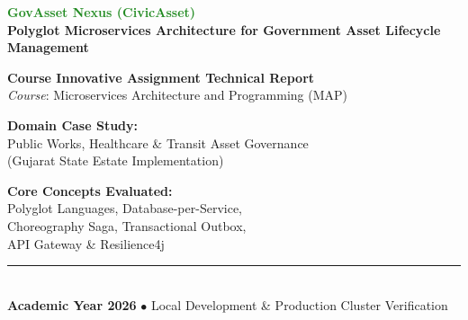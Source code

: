 \documentclass[11pt,a4paper]{article}
\begin{document}
\begin{titlepage}
    \centering
    \vspace*{1.5cm}
    
    {\Huge \bfseries \textcolor{forestgreen}{GovAsset Nexus (CivicAsset)}}\\[0.5cm]
    {\Large \bfseries Polyglot Microservices Architecture for Government Asset Lifecycle Management}\\[1.5cm]
    
    \begin{tcolorbox}[colback=forestgreen!10!white,colframe=forestgreen,arc=3mm,width=0.9\textwidth]
        \centering
        \textbf{Course Innovative Assignment Technical Report}\\
        \textit{Course}: Microservices Architecture and Programming (MAP)
    \end{tcolorbox}
    
    \vspace{2cm}
    
    \begin{minipage}{0.45\textwidth}
        \begin{flushleft} \large
            \textbf{Domain Case Study:}\\
            Public Works, Healthcare \& Transit Asset Governance\\
            (Gujarat State Estate Implementation)
        \end{flushleft}
    \end{minipage}
    \begin{minipage}{0.45\textwidth}
        \begin{flushright} \large
            \textbf{Core Concepts Evaluated:}\\
            Polyglot Languages, Database-per-Service,\\
            Choreography Saga, Transactional Outbox,\\
            API Gateway \& Resilience4j
        \end{flushright}
    \end{minipage}

    \vfill
    
    \noindent\rule{\textwidth}{0.8pt}\\[0.3cm]
    {\large \textbf{Academic Year 2026} \quad $\bullet$ \quad Local Development \& Production Cluster Verification}
\end{titlepage}
\end{document}
